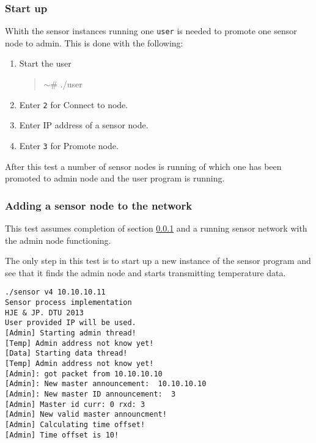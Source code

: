\subsubsection{Start up}
\label{subsubsec:startuptest}
Whith the sensor instances running one \texttt{user} is needed to promote one sensor node to admin. This is done with the following:
\begin{enumerate}
    \item Start the user
        \begin{quotation}
            $\sim$\# ./user
        \end{quotation}
    \item Enter \texttt{2} for Connect to node.
    \item Enter IP address of a sensor node.
    \item Enter \texttt{3} for Promote node.
\end{enumerate}
After this test a number of sensor nodes is running of which one has been promoted to admin node and the user program is running.
\subsubsection{Adding a sensor node to the network}
\label{subsubsec:addingnodetest}
This test assumes completion of section \ref{subsubsec:startuptest} and a running sensor network with the admin node functioning. 

The only step in this test is to start up a new instance of the sensor program and see that it finds the admin node and starts transmitting temperature data.
\begin{verbatim}
./sensor v4 10.10.10.11
Sensor process implementation
HJE & JP. DTU 2013
User provided IP will be used.
[Admin] Starting admin thread!
[Temp] Admin address not know yet!
[Data] Starting data thread!
[Temp] Admin address not know yet!
[Admin]: got packet from 10.10.10.10
[Admin]: New master announcement:  10.10.10.10
[Admin]: New master ID announcement:  3
[Admin] Master id curr: 0 rxd: 3
[Admin] New valid master announcment!
[Admin] Calculating time offset!
[Admin] Time offset is 10!
\end{verbatim}

